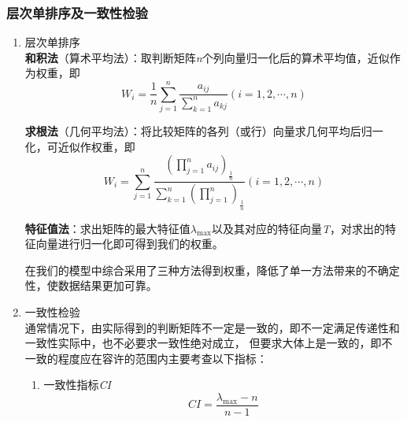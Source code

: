 \documentclass[a4paper, 12pt]{article}
\numberwithin{equation}{section}
\begin{document}
                \subsubsection{层次单排序及一致性检验}
                    \begin{enumerate}
                        \item 层次单排序 \\
                            \textbf{和积法}（算术平均法）：取判断矩阵\textit{n}个列向量归一化后的算术平均值，近似作为权重，即
                            \begin{equation}
                                W_{i} = \frac{1}{n} \sum_{j=1}^{n} \frac{a_{ij}}{\sum_{k=1}^{n} a_{kj}} (i = 1, 2, \cdots, n)
                            \end{equation}

                            \textbf{求根法}（几何平均法）：将比较矩阵的各列（或行）向量求几何平均后归一化，可近似作权重，即
                            \begin{equation}
                                W_{i} = \sum_{j=1}^{n} \frac{(\prod_{j=1}^{n} a_{ij})_{\frac{1}{n}}}{\sum_{k=1}^{n} (\prod_{j=1}^{n})_{\frac{1}{n}}} (i = 1, 2, \cdots, n)
                            \end{equation}

                            \textbf{特征值法}：求出矩阵的最大特征值$ \lambda _{\max} $以及其对应的特征向量\textit{T}，对求出的特征向量进行归一化即可得到我们的权重。

                            在我们的模型中综合采用了三种方法得到权重，降低了单一方法带来的不确定性，使数据结果更加可靠。


                        \item 一致性检验 \\
                        通常情况下，由实际得到的判断矩阵不一定是一致的，即不一定满足传递性和一致性实际中，也不必要求一致性绝对成立，
                        但要求大体上是一致的，即不一致的程度应在容许的范围内主要考查以下指标：
                            \begin{enumerate}
                                \item 一致性指标\textit{CI}
                                    \begin{equation}
                                        CI = \frac{\lambda _{\max} - n}{n - 1}
                                    \end{equation}


\end{enumerate}
\end{enumerate}
\end{document}
